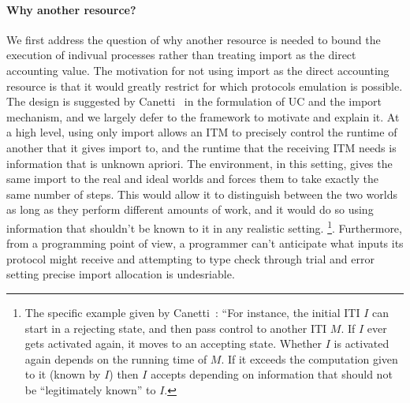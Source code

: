 \paragraph{Why another resource?} 
We first address the question of why another resource is needed to bound the execution of indivual processes rather than treating import as the direct accounting value.
The motivation for not using import as the direct accounting resource is that it would greatly restrict for which protocols emulation is possible.
The design is suggested by Canetti~\cite{canettiUC} in the formulation of UC and the import mechanism, and we largely defer to the framework to motivate and explain it.
At a high level, using only import allows an ITM to precisely control the runtime of another that it gives import to, and the runtime that the receiving ITM needs is information that is unknown apriori. 
The environment, in this setting, gives the same import to the real and ideal worlds and forces them to take exactly the same number of steps. 
This would allow it to distinguish between the two worlds as long as they perform different amounts of work, and it would do so using information that shouldn't be known to it in any realistic setting. 
\footnote{The specific example given by Canetti~\cite{canettiUC}: ``For instance, the initial ITI $I$ can start in a rejecting state, and then pass control to another ITI $M$. If $I$ ever gets activated again, it moves to an accepting state. Whether $I$ is activated again depends on the running time of $M$. If it exceeds the computation given to it (known by $I$) then $I$ accepts depending on information that should not be ``legitimately known'' to $I$.}.
Furthermore, from a programming point of view, a programmer can't anticipate what inputs its protocol might receive and attempting to type check through trial and error setting precise import allocation is undesriable.


